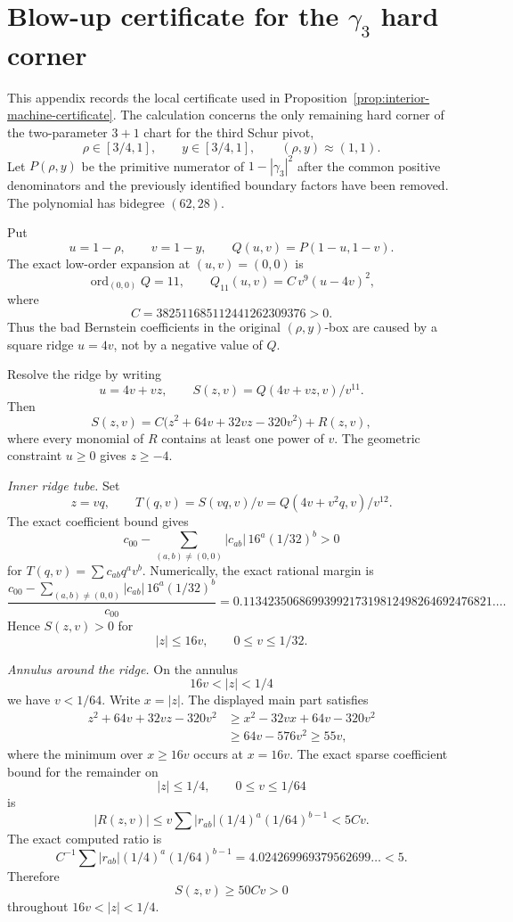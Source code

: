 \documentclass[11pt]{article}
\numberwithin{equation}{section}
\begin{document}
\section{Blow-up certificate for the \texorpdfstring{\(\gamma_3\)}{gamma3} hard corner}
\label{app:gamma-three-hard-corner}

This appendix records the local certificate used in
Proposition~\ref{prop:interior-machine-certificate}.  The calculation concerns
the only remaining hard corner of the two-parameter \(3{+}1\) chart for the
third Schur pivot,
\[
  \rho\in[3/4,1],\qquad y\in[3/4,1],
  \qquad (\rho,y)\approx(1,1).
\]
Let \(P(\rho,y)\) be the primitive numerator of \(1-|\gamma_3|^2\) after the
common positive denominators and the previously identified boundary factors
have been removed.  The polynomial has bidegree \((62,28)\).

Put
\[
  u=1-\rho,\qquad v=1-y,\qquad Q(u,v)=P(1-u,1-v).
\]
The exact low-order expansion at \((u,v)=(0,0)\) is
\[
  \operatorname{ord}_{(0,0)} Q=11,\qquad
  Q_{11}(u,v)=C\,v^9(u-4v)^2,
\]
where
\[
  C=382511685112441262309376>0.
\]
Thus the bad Bernstein coefficients in the original \((\rho,y)\)-box are
caused by a square ridge \(u=4v\), not by a negative value of \(Q\).

Resolve the ridge by writing
\[
  u=4v+vz,\qquad
  S(z,v)=Q(4v+vz,v)/v^{11}.
\]
Then
\[
  S(z,v)
  =C\bigl(z^2+64v+32vz-320v^2\bigr)+R(z,v),
\]
where every monomial of \(R\) contains at least one power of \(v\).  The
geometric constraint \(u\ge0\) gives \(z\ge-4\).

\smallskip
\noindent\textit{Inner ridge tube.}
Set
\[
  z=vq,\qquad T(q,v)=S(vq,v)/v=Q(4v+v^2q,v)/v^{12}.
\]
The exact coefficient bound gives
\[
  c_{00}-\sum_{(a,b)\ne(0,0)} |c_{ab}|\,16^a(1/32)^b>0
\]
for \(T(q,v)=\sum c_{ab}q^a v^b\).  Numerically, the exact rational margin is
\[
  \frac{c_{00}-\sum_{(a,b)\ne(0,0)} |c_{ab}|\,16^a(1/32)^b}{c_{00}}
  =0.1134235068699399217319812498264692476821\ldots .
\]
Hence \(S(z,v)>0\) for
\[
  |z|\le16v,\qquad 0\le v\le1/32 .
\]

\smallskip
\noindent\textit{Annulus around the ridge.}
On the annulus
\[
  16v<|z|<1/4
\]
we have \(v<1/64\).  Write \(x=|z|\).  The displayed main part satisfies
\[
\begin{aligned}
  z^2+64v+32vz-320v^2
  &\ge x^2-32vx+64v-320v^2  \\
  &\ge 64v-576v^2
  \ge 55v ,
\end{aligned}
\]
where the minimum over \(x\ge16v\) occurs at \(x=16v\).  The exact sparse
coefficient bound for the remainder on
\[
  |z|\le1/4,\qquad 0\le v\le1/64
\]
is
\[
  |R(z,v)|
  \le
  v\sum |r_{ab}|(1/4)^a(1/64)^{b-1}
  <5Cv.
\]
The exact computed ratio is
\[
  C^{-1}\sum |r_{ab}|(1/4)^a(1/64)^{b-1}
  =4.024269969379562699\ldots <5 .
\]
Therefore
\[
  S(z,v)\ge 50Cv>0
\]
throughout \(16v<|z|<1/4\).
\end{document}
